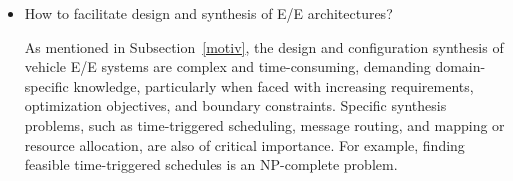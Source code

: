     \begin{itemize}
    
        \item How to facilitate design and synthesis of E/E architectures? 
        
        
        
        
        As mentioned in Subsection~\ref{motiv}, the design and configuration synthesis of vehicle E/E systems are complex and time-consuming, demanding domain-specific knowledge, particularly when faced with increasing requirements, optimization objectives, and boundary constraints. Specific synthesis problems, such as time-triggered scheduling, message routing, and mapping or resource allocation, are also of critical importance. For example, finding feasible time-triggered schedules is an NP-complete problem.



\end{itemize}
